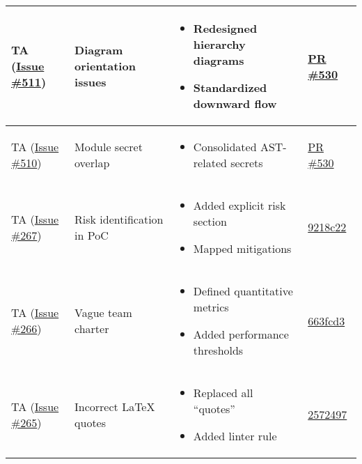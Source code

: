 \documentclass{article}
\begin{document}
\begin{table}[h]
\begin{tabularx}{\textwidth}{|l|X|X|X|}
    TA (\href{https://github.com/ssm-lab/capstone--source-code-optimizer/issues/511}{Issue \#511}) & 
    Diagram orientation issues &
    \begin{itemize}
        \item Redesigned hierarchy diagrams
        \item Standardized downward flow
    \end{itemize} &
    \href{https://github.com/ssm-lab/capstone--source-code-optimizer/issues/530}{PR \#530} \\
    \hline
    
    TA (\href{https://github.com/ssm-lab/capstone--source-code-optimizer/issues/510}{Issue \#510}) & 
    Module secret overlap &
    \begin{itemize}
        \item Consolidated AST-related secrets
    \end{itemize} &
    \href{https://github.com/ssm-lab/capstone--source-code-optimizer/issues/530}{PR \#530} \\
    \hline
    
    TA (\href{https://github.com/ssm-lab/capstone--source-code-optimizer/issues/267}{Issue \#267}) & 
    Risk identification in PoC &
    \begin{itemize}
        \item Added explicit risk section
        \item Mapped mitigations
    \end{itemize} &
    \href{https://github.com/ssm-lab/capstone--source-code-optimizer/commit/9218c22}{9218c22} \\
    \hline
    
    TA (\href{https://github.com/ssm-lab/capstone--source-code-optimizer/issues/266}{Issue \#266}) & 
    Vague team charter &
    \begin{itemize}
        \item Defined quantitative metrics
        \item Added performance thresholds
    \end{itemize} &
    \href{https://github.com/ssm-lab/capstone--source-code-optimizer/commit/663fcd3}{663fcd3} \\
    \hline
    
    TA (\href{https://github.com/ssm-lab/capstone--source-code-optimizer/issues/265}{Issue \#265}) & 
    Incorrect LaTeX quotes &
    \begin{itemize}
        \item Replaced all ``quotes''
        \item Added linter rule
    \end{itemize} &
    \href{https://github.com/ssm-lab/capstone--source-code-optimizer/commit/2572497}{2572497} \\
    \hline
    

\end{tabularx}
\end{table}
\end{document}
